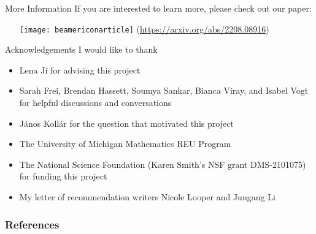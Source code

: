 \documentclass[hyperref, notheorems]{beamer}
\theoremstyle{definition}
\begin{document}
\begin{frame}{More Information}
If you are interested to learn more, please check out our paper:
    \begin{itemize}
        \item[{\texttt{[image: beamericonarticle]}}] 
(\url{https://arxiv.org/abs/2208.08916})
    \end{itemize}

\end{frame}

\begin{frame}{Acknowledgements}
I would like to thank
\begin{itemize}
    \item Lena Ji for advising this project
    \item Sarah Frei, Brendan Hassett, Soumya Sankar, Bianca Viray, and Isabel Vogt for helpful discussions and conversations 
    \item János Kollár for the question that motivated this project
    \item The University of Michigan Mathematics REU Program
    \item The National Science Foundation (Karen Smith’s NSF grant DMS-2101075) for funding this project
    \item My letter of recommendation writers Nicole Looper and Jungang Li
\end{itemize}
\end{frame}

\begin{frame}[allowframebreaks]
\frametitle{References}


\end{frame}
\end{document}
